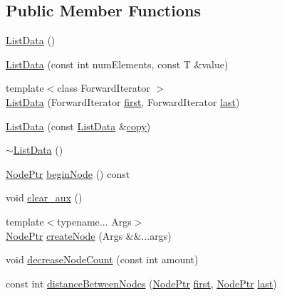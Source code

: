 \subsection*{Public Member Functions}
\begin{DoxyCompactItemize}
\item 
\hyperlink{structprism_1_1_list_data_ad814cce2cec4dbb5c411781c090100a3}{List\+Data} ()
\item 
\hyperlink{structprism_1_1_list_data_ab429e9c74a766affc172de276a46f000}{List\+Data} (const int num\+Elements, const T \&value)
\item 
{\footnotesize template$<$class Forward\+Iterator $>$ }\\\hyperlink{structprism_1_1_list_data_abf348eaf212180d0896177e6058cfcd6}{List\+Data} (Forward\+Iterator \hyperlink{namespaceprism_ae3fb7a1926a9e8e59300cd5e370470da}{first}, Forward\+Iterator \hyperlink{namespaceprism_abe4956c4e865f55ca126b7fb973b5078}{last})
\item 
\hyperlink{structprism_1_1_list_data_a0a058246795e873c0133c128f0abc941}{List\+Data} (const \hyperlink{structprism_1_1_list_data}{List\+Data} \&\hyperlink{namespaceprism_ae776f4cd825f79e7af1cf6ee1d90a209}{copy})
\item 
\hyperlink{structprism_1_1_list_data_aaa03c5725d1dcc32beed35d6f6b75c05}{$\sim$\+List\+Data} ()
\item 
\hyperlink{structprism_1_1_list_data_a6abedadad0342afa083fed664b90d474}{Node\+Ptr} \hyperlink{structprism_1_1_list_data_a91c29217093354ea42fac17ef776f24a}{begin\+Node} () const 
\item 
void \hyperlink{structprism_1_1_list_data_a262712b0f5abb93b55d65dc2fec24f24}{clear\+\_\+aux} ()
\item 
{\footnotesize template$<$typename... Args$>$ }\\\hyperlink{structprism_1_1_list_data_a6abedadad0342afa083fed664b90d474}{Node\+Ptr} \hyperlink{structprism_1_1_list_data_a327056451f320f8f01283ad62542a436}{create\+Node} (Args \&\&...args)
\item 
void \hyperlink{structprism_1_1_list_data_a2925beeea7316e8e2e1a43a3bacca8ee}{decrease\+Node\+Count} (const int amount)
\item 
const int \hyperlink{structprism_1_1_list_data_abd3dbc774d0b07c0babb009eda13f692}{distance\+Between\+Nodes} (\hyperlink{structprism_1_1_list_data_a6abedadad0342afa083fed664b90d474}{Node\+Ptr} \hyperlink{namespaceprism_ae3fb7a1926a9e8e59300cd5e370470da}{first}, \hyperlink{structprism_1_1_list_data_a6abedadad0342afa083fed664b90d474}{Node\+Ptr} \hyperlink{namespaceprism_abe4956c4e865f55ca126b7fb973b5078}{last})

\end{DoxyCompactItemize}
